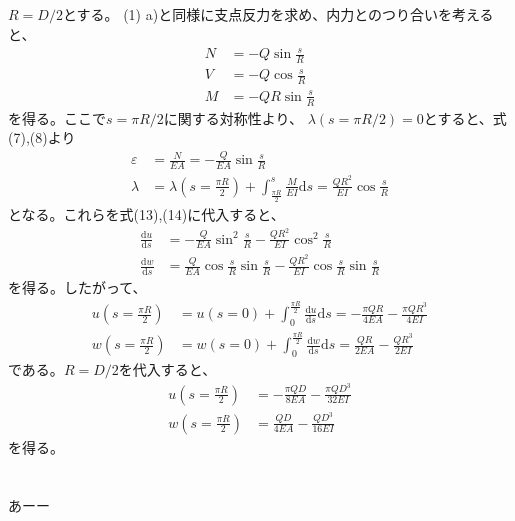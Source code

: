 \documentclass[a4paper]{jsarticle}
\begin{document}
\subsection{}
$R = D/2$とする。
(1) a)と同様に支点反力を求め、内力とのつり合いを考えると、
\begin{align}
  N &= -Q \sin \frac{s}{R} \\
  V &= -Q \cos \frac{s}{R} \\
  M &= -Q R \sin \frac{s}{R}
\end{align}
を得る。ここで$s = \pi R / 2$に関する対称性より、
$\lambda(s = \pi R / 2) = 0$とすると、式(7),(8)より
\begin{align}
  \varepsilon &= \frac{N}{E A} =
  -\frac{Q}{E A} \sin \frac{s}{R} \\
  \lambda &= \lambda\left(s = \frac{\pi R}{2}\right)
  + \int_{\frac{\pi R}{2}}^s \frac{M}{E I} \mathrm{d} s
  = \frac{Q R^2}{E I} \cos \frac{s}{R}
\end{align}
となる。これらを式(13),(14)に代入すると、
\begin{align}
  \frac{\mathrm{d} u}{\mathrm{d} s}
  &= -\frac{Q}{E A} \sin^2 \frac{s}{R}
  - \frac{Q R^2}{E I} \cos^2 \frac{s}{R} \\
  \frac{\mathrm{d} w}{\mathrm{d} s}
  &= \frac{Q}{E A} \cos \frac{s}{R} \sin \frac{s}{R}
  - \frac{Q R^2}{E I} \cos \frac{s}{R} \sin \frac{s}{R}
\end{align}
を得る。したがって、
\begin{align}
  u \left(s = \frac{\pi R}{2}\right) &= u(s = 0)
  + \int_0^{\frac{\pi R}{2}} \frac{\mathrm{d} u}{\mathrm{d} s} \mathrm{d} s
  = -\frac{\pi Q R}{4 E A} - \frac{\pi Q R^3}{4 E I}\\
  w \left(s = \frac{\pi R}{2}\right) &= w(s = 0)
  + \int_0^{\frac{\pi R}{2}} \frac{\mathrm{d} w}{\mathrm{d} s} \mathrm{d} s
  = \frac{Q R}{2 E A} - \frac{Q R^3}{2 E I}
\end{align}
である。$R = D/2$を代入すると、
\begin{align}
  u \left(s = \frac{\pi R}{2}\right)
  &= -\frac{\pi Q D}{8 E A} - \frac{\pi Q D^3}{32 E I} \\
  w \left(s = \frac{\pi R}{2}\right)
  &= \frac{Q D}{4 E A} - \frac{Q D^3}{16 E I}
\end{align}
を得る。

\section{}
あーー
\end{document}
